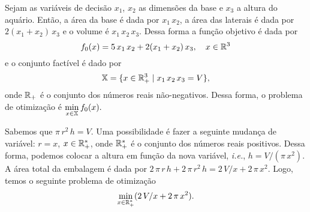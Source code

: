 \begin{questions}
\begin{solution}
	Sejam as variáveis de decisão $x_1$, $x_2$ as dimensões da base e $x_3$ a altura do aquário. Então, a área da base é dada por $x_1\,x_2$, a área das laterais é dada por $2(x_1+x_2)\,x_3$ e o volume é $x_1\,x_2\,x_3$. Dessa forma a função objetivo é dada por
    \[f_0(x) = 5\,x_1\,x_2 + 2(x_1+x_2)\,x_3,\quad x\in{\mathbb R}^3\]
    e o conjunto factível é dado por
    \[{\mathbb X} = \{x\in{\mathbb R}_+^3 \mid x_1\,x_2\,x_3 = V\},\]
    onde ${\mathbb R}_+$ é o conjunto dos números reais não-negativos.
    Dessa forma, o problema de otimização é
    \(\displaystyle\min_{x\in{\mathbb X}} f_0(x).\)
\end{solution}

\begin{solution}
	Sabemos que $\pi\,r^2\,h = V$. Uma possibilidade é fazer a seguinte mudança de variável: $r = x$, $x\in{\mathbb R}_+^*$, onde ${\mathbb R}_+^*$ é o conjunto dos números reais positivos. Dessa forma, podemos colocar a altura em função da nova variável, \emph{i.e.}, $h = V/(\pi\,x^2)$. A área total da embalagem é dada por $2\,\pi\,r\,h+2\,\pi\,r^2\,h = 2\,V/x + 2\,\pi\,x^2$. Logo, temos o seguinte problema de otimização
    \[\min_{x\in{\mathbb R}_+^*} (2\,V/x + 2\,\pi\,x^2).\]
\end{solution}


\end{questions}
